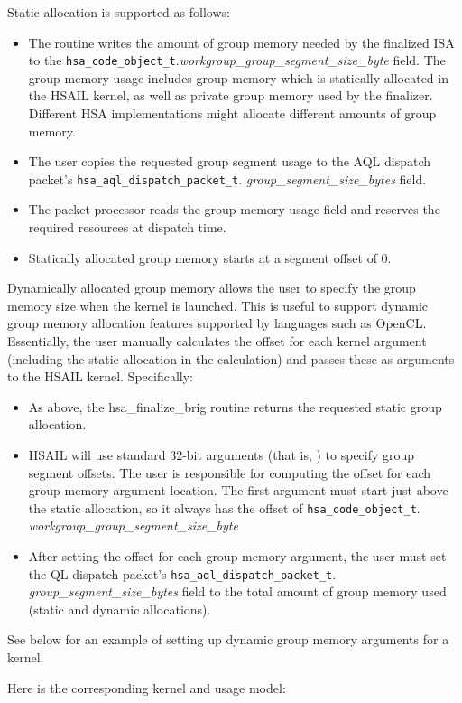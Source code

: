 Static allocation is supported as follows\-:

\begin{itemize}

\item The  routine writes the amount of
group memory needed by the finalized I\-S\-A to the
\texttt{hsa\_code\_object\_t}.{\itshape workgroup\_group\_segment\_size\_byte}
field.  The group memory usage includes group memory which is
statically allocated in the H\-S\-A\-I\-L kernel, as well as private
group memory used by the finalizer. Different H\-S\-A
implementations might allocate different amounts of group memory.

\item The user copies the requested group segment usage to the
A\-Q\-L dispatch packet's \texttt{hsa\_aql\_dispatch\_packet\_t}.{\itshape
group\_segment\_size\_bytes} field.

\item The packet processor reads the group memory usage field and
reserves the required resources at dispatch time.

\item Statically allocated group memory starts at a segment offset
of 0.

\end{itemize}

Dynamically allocated group memory allows the user to specify the
group memory size when the kernel is launched. This is useful to
support dynamic group memory allocation features supported by
languages such as Open\-C\-L. Essentially, the user manually
calculates the offset for each kernel argument (including the static
allocation in the calculation) and passes these as arguments to the
H\-S\-A\-I\-L kernel. Specifically\-:

\begin{itemize}

\item As above, the {hsa\_finalize\_brig} routine returns the
requested static group allocation.

\item H\-S\-A\-I\-L will use standard 32-\/bit arguments (that is,
) to specify group segment offsets. The user is
responsible for computing the offset for each group memory argument
location. The first argument must start just above the static
allocation, so it always has the offset of
\texttt{hsa\_code\_object\_t}.{\itshape
workgroup\_group\_segment\_size\_byte}

\item After setting the offset for each group memory argument, the
user must set the \-Q\-L dispatch packet's
\texttt{hsa\_aql\_dispatch\_packet\_t}.{\itshape
group\_segment\_size\_bytes} field to the total amount of group
memory used (static and dynamic allocations).

\end{itemize}

See below for an example of setting up dynamic group memory
arguments for a kernel.
\begin{framed}

\end{framed}

Here is the corresponding kernel and usage model\-:

\begin{framed}

\end{framed}

